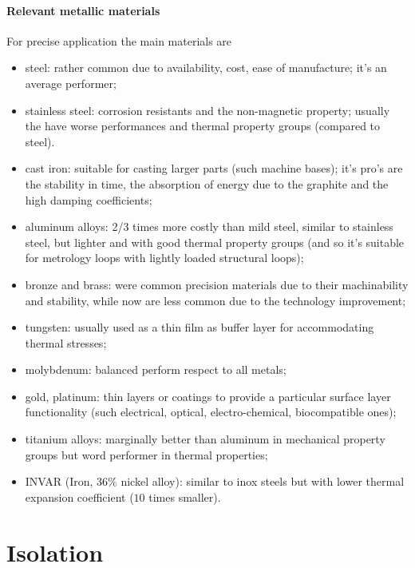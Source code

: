 	\paragraph{Relevant metallic materials} For precise application the main materials are 
	\begin{itemize}
		\item steel: rather common due to availability, cost, ease of manufacture; it's an average performer;
		
		\item stainless steel: corrosion resistants and the non-magnetic property; usually the have worse performances and thermal property groups (compared to steel).
		
		\item cast iron: suitable for casting larger parts (such machine bases); it's pro's are the stability in time, the absorption of energy due to the graphite and the high damping coefficients;
		
		\item aluminum alloys: 2/3 times more costly than mild steel, similar to stainless steel, but lighter and with good thermal property groups (and so it's suitable for metrology loops  with lightly loaded structural loops);
		
		\item bronze and brass: were common precision materials due to their machinability and stability, while now are less common due to the technology improvement;
		
		\item tungsten: usually used as a thin film as buffer layer for accommodating thermal stresses;
		
		\item molybdenum: balanced perform respect to all metals;
		
		\item gold, platinum: thin layers or coatings to provide a particular surface layer functionality (such electrical, optical, electro-chemical, biocompatible ones);
		
		\item titanium alloys: marginally better than aluminum in mechanical property groups but word performer in thermal properties;
		
		\item INVAR (Iron, $36\%$ nickel alloy): similar to inox steels but with lower thermal expansion coefficient ($10$ times smaller).
	\end{itemize}
	
	
	
	
	
	
	
	
	
	
	
	
	
	
	
	


\section{Isolation}